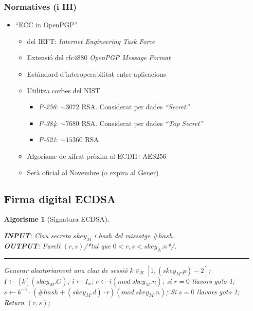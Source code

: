 \documentclass{beamer}
\theoremstyle{saltolinea}   			%
\newtheorem{algo}{Algorisme}
\begin{document}
\begin{frame}
  \frametitle{Normatives (i III)}
  \begin{itemize}
    \item<1-> ``ECC in OpenPGP''
    \begin{itemize}
      \item<2-> del IEFT: \emph{Internet Engineering Task Force}
      \item<3-> Extensi\'o del rfc4880 \emph{OpenPGP Message Format}
      \item<4-> Est\`andard d'interoperabilitat entre aplicacions
      \item<5-> Utilitza corbes del NIST
      \begin{itemize}
        \item<6-> \emph{P-256}: $\sim 3072$ RSA. Considerat per dades \emph{``Secret''}
        \item<7-> \emph{P-384}: $\sim 7680$ RSA. Considerat per dades \emph{``Top Secret''}
        \item<8-> \emph{P-521}: $\sim 15360$ RSA
      \end{itemize}
      \item<9-> Algorisme de xifrat pr\`oxim al ECDH+AES256
      \item<10-> Ser\`a oficial al Novembre (o expira al Gener)
    \end{itemize}
  \end{itemize}
\end{frame}

\subsection{Firma digital ECDSA}

\begin{frame}
  \begin{algo}[Signatura ECDSA]\label{alg:ECDSA}
    \parbox[b]{\linewidth}{%
      {\bf INPUT}: Clau secreta $skey_{M}$ i hash del missatge $\#hash$.\\
      {\bf OUTPUT}: Parell $\left(r,s\right)$/{*}tal que $0<r,s<skey_{A}.n${*}/.
      \hrule
    }%
    \vspace{-7mm}
    \begin{algorithmic}[1]
      \STATE Generar aleatoriament una clau de sessi\'o $k\in_{R}\left[1,\left(skey_{M}.p\right)-2\right]$;
      \STATE \alert<2>{$I\leftarrow \left[k\right]\left(skey_{M}.G\right)$;}
      \STATE $i\leftarrow I_{x}$;
      \STATE $r\leftarrow i\left(mod\: skey_{M}.n\right)$;
      \STATE si $r=0$ llavors goto 1;
      \STATE $s\leftarrow k^{-1}\cdot\left(\# hash+\left(skey_{M}.d\right)\cdot r\right)\left(mod\: skey_{M}.n\right)$;
      \STATE Si $s=0$ llavors goto 1;
      \STATE Return $(r,s)$;
    \end{algorithmic}
  \end{algo}%
\end{frame}
\end{document}
